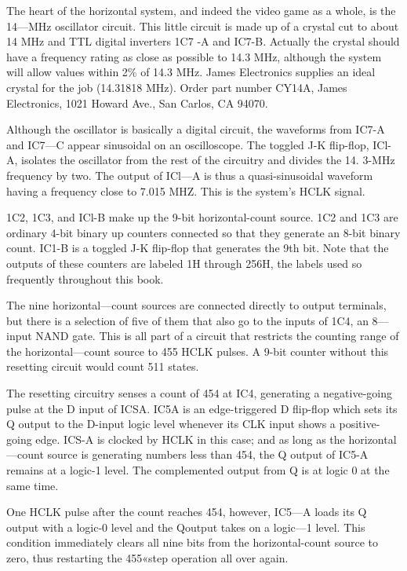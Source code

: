 \documentclass[11pt]{book}              %
\begin{document}
The heart of the horizontal system, and indeed the video game as a whole, is the 14—MHz oscillator circuit. This little circuit is made up of a crystal cut to about 14 MHz and TTL digital inverters 1C7 -A and IC7-B. Actually the crystal should have a frequency rating as close as possible to 14.3 MHz, although the system will allow values within 2\% of 14.3 MHz. James Electronics supplies an ideal crystal for the job (14.31818 MHz). Order part number CY14A, James Electronics, 1021 Howard Ave., San Carlos, CA 94070.

Although the oscillator is basically a digital circuit, the waveforms from IC7-A and IC7—C appear sinusoidal on an oscilloscope. The toggled J-K flip-flop, ICl-A, isolates the oscillator from the rest of the circuitry and divides the 14. 3-MHz frequency by two. The output of ICl—A is thus a quasi-sinusoidal waveform having a frequency close to 7.015 MHZ. This is the system's HCLK signal.

1C2, 1C3, and ICl-B make up the 9-bit horizontal-count source. 1C2 and 1C3 are ordinary 4-bit binary up counters connected so that they generate an 8-bit binary count. IC1-B is a toggled J-K flip-flop that generates the 9th bit. Note that the outputs of these counters are labeled 1H through 256H, the labels used so frequently throughout this book.

The nine horizontal—count sources are connected directly to output terminals, but there is a selection of five of them that also go to the inputs of 1C4, an 8—input NAND gate. This is all part of a circuit that restricts the counting range of the horizontal—count source to 455 HCLK pulses. A 9-bit counter without this resetting circuit would count 511 states.

The resetting circuitry senses a count of 454 at IC4, generating a negative-going pulse at the D input of ICSA. IC5A is an edge-triggered D flip-flop which sets its Q output to the D-input logic level whenever its CLK input shows a positive-going edge. ICS-A is clocked by HCLK in this case; and as long as the horizontal—count source is generating numbers less than 454, the Q output of IC5-A remains at a logic-1 level. The complemented output from Q is at logic 0 at the same time.

One HCLK pulse after the count reaches 454, however, IC5—A loads its Q output with a logic-0 level and the Qoutput takes on a logic—1 level. This condition immediately clears all nine bits from the horizontal-count source to zero, thus restarting the 455«step operation all over again.
\end{document}
